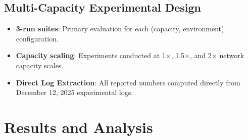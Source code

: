 \documentclass[12pt,a4paper]{article}
\begin{document}
\subsection{Multi-Capacity Experimental Design}
\begin{itemize}
\item \textbf{3-run suites}: Primary evaluation for each (capacity, environment) configuration.
\item \textbf{Capacity scaling}: Experiments conducted at 1$\times$, 1.5$\times$, and 2$\times$ network capacity scales.
\item \textbf{Direct Log Extraction}: All reported numbers computed directly from December 12, 2025 experimental logs.
\end{itemize}

\newpage
\section{Results and Analysis}
\end{document}
